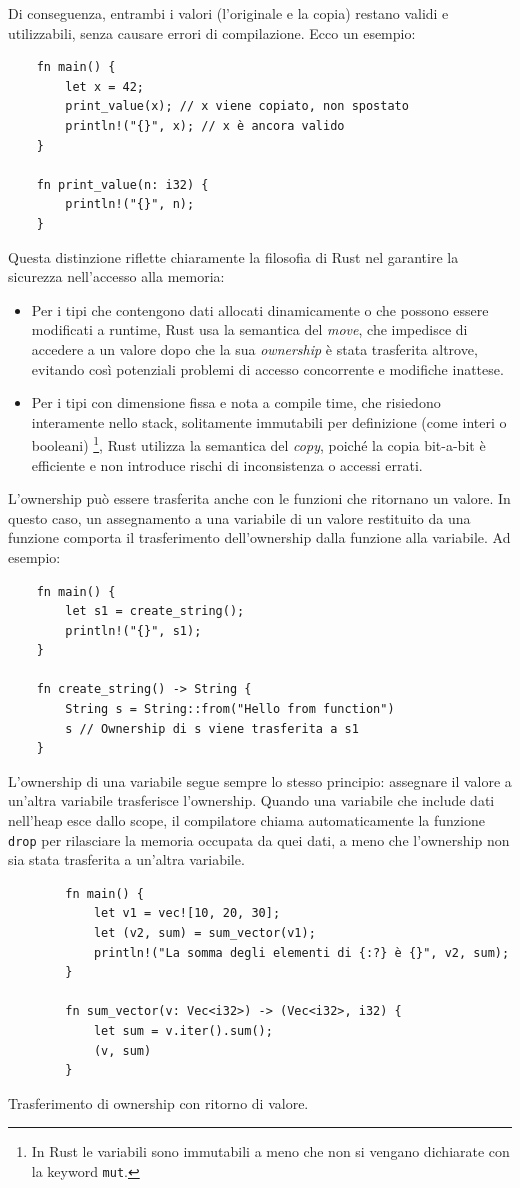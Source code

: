 Di conseguenza, entrambi i valori (l'originale e la copia) restano validi e utilizzabili, senza causare errori di compilazione. Ecco un esempio:
\begin{verbatim}
    fn main() {
        let x = 42;
        print_value(x); // x viene copiato, non spostato
        println!("{}", x); // x è ancora valido
    }

    fn print_value(n: i32) {
        println!("{}", n);
    }
\end{verbatim}
Questa distinzione riflette chiaramente la filosofia di Rust nel garantire la sicurezza nell'accesso alla memoria:
\begin{itemize}
    \item Per i tipi che contengono dati allocati dinamicamente o che possono essere modificati a runtime, Rust usa la semantica del \textit{move}, che impedisce di accedere a un valore dopo che la sua \textit{ownership} è stata trasferita altrove, evitando così potenziali problemi di accesso concorrente e modifiche inattese.
    \item Per i tipi con dimensione fissa e nota a compile time, che risiedono interamente nello stack, solitamente immutabili per definizione (come interi o booleani) \footnote{In Rust le variabili sono immutabili a meno che non si vengano dichiarate con la keyword \texttt{mut}.}, Rust utilizza la semantica del \textit{copy}, poiché la copia bit-a-bit è efficiente e non introduce rischi di inconsistenza o accessi errati.
\end{itemize}
L'ownership può essere trasferita anche con le funzioni che ritornano un valore. In questo caso, un assegnamento a una variabile di un valore restituito da una funzione comporta il trasferimento dell'ownership dalla funzione alla variabile. Ad esempio:
\begin{verbatim}
    fn main() {
        let s1 = create_string(); 
        println!("{}", s1);
    }

    fn create_string() -> String {
        String s = String::from("Hello from function")
        s // Ownership di s viene trasferita a s1
    }
\end{verbatim}
L'ownership di una variabile segue sempre lo stesso principio: assegnare il valore a un'altra variabile trasferisce l'ownership. Quando una variabile che include dati nell'heap esce dallo scope, il compilatore chiama automaticamente la funzione \texttt{drop} per rilasciare la memoria occupata da quei dati, a meno che l'ownership non sia stata trasferita a un'altra variabile.
\begin{listing}[H]
    \begin{verbatim}
        fn main() {
            let v1 = vec![10, 20, 30];
            let (v2, sum) = sum_vector(v1); 
            println!("La somma degli elementi di {:?} è {}", v2, sum);
        }

        fn sum_vector(v: Vec<i32>) -> (Vec<i32>, i32) {
            let sum = v.iter().sum();
            (v, sum)
        }
    \end{verbatim}
    \caption{Trasferimento di ownership con ritorno di valore.}
    \label{lst:ownership-return}
\end{listing}

